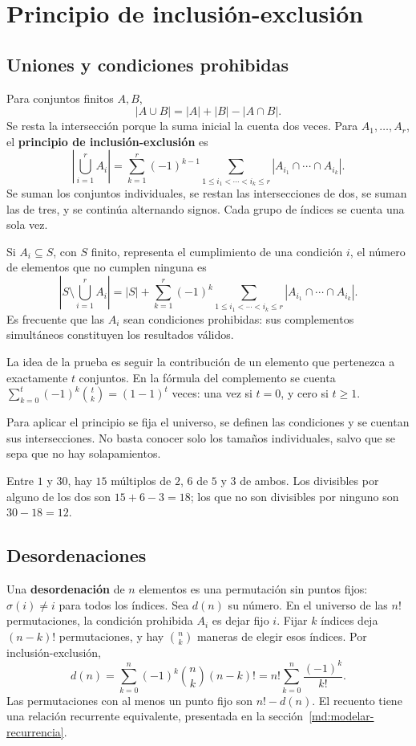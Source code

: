 \chapter{Principio de inclusión-exclusión}
\label{md:inclusion-exclusion}

\section{Uniones y condiciones prohibidas}

Para conjuntos finitos $A,B$,
\[
 |A\cup B|=|A|+|B|-|A\cap B|.
\]
Se resta la intersección porque la suma inicial la cuenta dos veces.
Para $A_1,\ldots,A_r$, el \textbf{principio de inclusión-exclusión} es
\[
 \boxed{\left|\bigcup_{i=1}^r A_i\right|
 =\sum_{k=1}^r(-1)^{k-1}
   \sum_{1\le i_1<\cdots<i_k\le r}
   |A_{i_1}\cap\cdots\cap A_{i_k}|.}
\]
Se suman los conjuntos individuales, se restan las intersecciones
de dos, se suman las de tres, y se continúa alternando signos.
Cada grupo de índices se cuenta una sola vez.

Si $A_i\subseteq S$, con $S$ finito, representa el cumplimiento
de una condición $i$, el número de elementos que no cumplen ninguna es
\[
 \left|S\setminus\bigcup_{i=1}^r A_i\right|
 =|S|+\sum_{k=1}^r(-1)^k
   \sum_{1\le i_1<\cdots<i_k\le r}
   |A_{i_1}\cap\cdots\cap A_{i_k}|.
\]
Es frecuente que las $A_i$ sean condiciones prohibidas:
sus complementos simultáneos constituyen los resultados válidos.

La idea de la prueba es seguir la contribución de un elemento que
pertenezca a exactamente $t$ conjuntos. En la fórmula del complemento
se cuenta $\sum_{k=0}^t(-1)^k\binom tk=(1-1)^t$ veces:
una vez si $t=0$, y cero si $t\ge1$.

Para aplicar el principio se fija el universo, se definen las
condiciones y se cuentan sus intersecciones. No basta conocer solo
los tamaños individuales, salvo que se sepa que no hay solapamientos.

\begin{ejemplo}
Entre $1$ y $30$, hay $15$ múltiplos de $2$, $6$ de $5$ y $3$ de ambos.
Los divisibles por alguno de los dos son $15+6-3=18$;
los que no son divisibles por ninguno son $30-18=12$.
\end{ejemplo}

\newpage
\section{Desordenaciones}
\label{md:desordenaciones}

Una \textbf{desordenación} de $n$ elementos es una permutación sin
puntos fijos: $\sigma(i)\ne i$ para todos los índices.
Sea $d(n)$ su número.
En el universo de las $n!$ permutaciones, la condición prohibida
$A_i$ es dejar fijo $i$. Fijar $k$ índices deja $(n-k)!$ permutaciones,
y hay $\binom nk$ maneras de elegir esos índices.
Por inclusión-exclusión,
\[
 \boxed{d(n)=\sum_{k=0}^n(-1)^k\binom nk(n-k)!
          =n!\sum_{k=0}^n\frac{(-1)^k}{k!}.}
\]
Las permutaciones con al menos un punto fijo son $n!-d(n)$.
El recuento tiene una relación recurrente equivalente, presentada
en la sección~\ref{md:modelar-recurrencia}.
